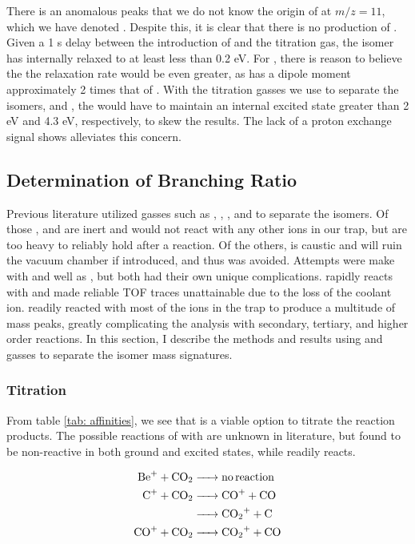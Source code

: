 There is an anomalous peaks that we do not know the origin of at $m/z=11$, which we have denoted . Despite this, it is clear that there is no production of . Given a 1 s delay between the introduction of  and the titration gas, the  isomer has internally relaxed to at least less than 0.2 eV. For , there is reason to believe the the relaxation rate would be even greater, as  has a dipole moment approximately 2 times that of .\cite{Rogers1982} With the titration gasses we use to separate the isomers,  and , the  would have to maintain an internal excited state greater than 2 eV and 4.3 eV, respectively, to skew the results. The lack of a proton exchange signal shows alleviates this concern.

\subsection{Determination of Branching Ratio}

Previous literature utilized gasses such as , , , and  to separate the isomers. Of those , and  are inert and would not react with any other ions in our trap, but are too heavy to reliably hold after a reaction. Of the others,  is caustic and will ruin the vacuum chamber if introduced, and thus was avoided. Attempts were make with  and well as , but both had their own unique complications.  rapidly reacts with  and made reliable TOF traces unattainable due to the loss of the coolant ion.  readily reacted with most of the ions in the trap to produce a multitude of mass peaks, greatly complicating the analysis with secondary, tertiary, and higher order reactions. In this section, I describe the methods and results using  and  gasses to separate the isomer mass signatures.

\subsubsection{ Titration}

From table \ref{tab: affinities}, we see that  is a viable option to titrate the reaction products. The possible reactions of  with  are unknown in literature, but found to be non-reactive in both ground and excited states, while  readily reacts.

\begin{align}
	\ce{Be+ + CO2 & -> no reaction} \nonumber \\
	\ce{C+ + CO2 & -> CO+ + CO} \label{r: C+CO2->CO} \\
	\ce{& -> CO2+ + C} \label{r: C+CO2->CO2} \\
	\ce{CO+ + CO2 & -> CO2+ + CO} \label{r: CO+CO2->CO2}
\end{align}

